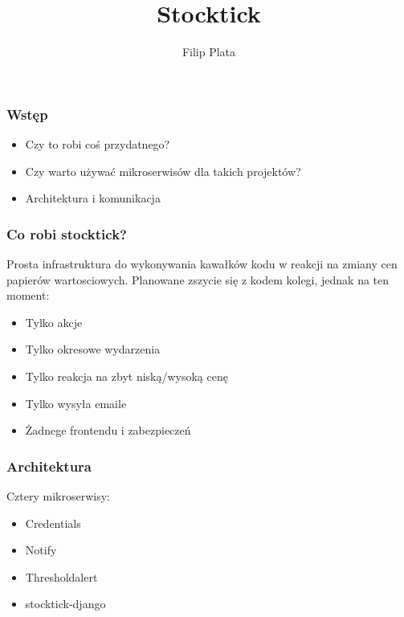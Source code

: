 \documentclass[serif,mathserif]{beamer}
\author[Filip Plata]{Filip Plata}
\title[Short Title\hspace{2em}\insertframenumber/\inserttotalframenumber]{Stocktick}
\institute{Uniwersytet Warszawski}
\begin{document}
\maketitle


\begin{frame}
  \frametitle{Wstęp}
  \pause
  \begin{itemize}
  \item Czy to robi coś przydatnego?\pause
  \item Czy warto używać mikroserwisów dla takich projektów?\pause
  \item Architektura i komunikacja
  \end{itemize}
\end{frame}


\begin{frame}
  \frametitle{Co robi stocktick?}
  Prosta infrastruktura do wykonywania kawałków kodu
  w reakcji na zmiany cen papierów wartosciowych.
  Planowane zszycie się z kodem kolegi, jednak na ten moment:
  \begin{itemize}
  \item Tylko akcje\pause
  \item Tylko okresowe wydarzenia \pause
  \item Tylko reakcja na zbyt niską/wysoką cenę\pause
  \item Tylko wysyła emaile\pause
  \item Żadnege frontendu i zabezpieczeń
  \end{itemize}
\end{frame}

\begin{frame}
  \frametitle{Architektura}
  Cztery mikroserwisy:
  \begin{itemize}
  \item Credentials
  \item Notify
  \item Thresholdalert
  \item stocktick-django
  \end{itemize}
\end{frame}
\end{document}
